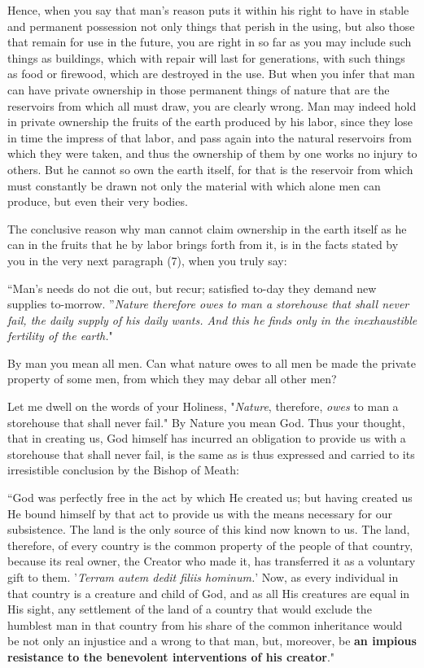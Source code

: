 \documentclass{book}
\begin{document}
Hence, when you say that man’s reason puts it within his right to have in stable and permanent possession not only things that perish in the using, but also those that remain for use in the future, you are right in so far as you may include such things as buildings, which with repair will last for generations, with such things as food or firewood, which are destroyed in the use. But when you infer that man can have private ownership in those permanent things of nature that are the reservoirs from which all must draw, you are clearly wrong. Man may indeed hold in private ownership the fruits of the earth produced by his labor, since they lose in time the impress of that labor, and pass again into the natural reservoirs from which they were taken, and thus the ownership of them by one works no injury to others. But he cannot so own the earth itself, for that is the reservoir from which must constantly be drawn not only the material with which alone men can produce, but even their very bodies.

The conclusive reason why man cannot claim ownership in the earth itself as he can in the fruits that he by labor brings forth from it, is in the facts stated by you in the very next paragraph (7), when you truly say:

“Man’s needs do not die out, but recur; satisfied to-day they demand new supplies to-morrow. ”\emph{Nature therefore owes to man a storehouse that shall never fail, the daily supply of his daily wants. And this he finds only in the inexhaustible fertility of the earth.}"

By man you mean all men. Can what nature owes to all men be made the private property of some men, from which they may debar all other men?

Let me dwell on the words of your Holiness, "\emph{Nature}, therefore, \emph{owes} to man a storehouse that shall never fail." By Nature you mean God. Thus your thought, that in creating us, God himself has incurred an obligation to provide us with a storehouse that shall never fail, is the same as is thus expressed and carried to its irresistible conclusion by the Bishop of Meath:

“God was perfectly free in the act by which He created us; but having created us He bound himself by that act to provide us with the means necessary for our subsistence. The land is the only source of this kind now known to us. The land, therefore, of every country is the common property of the people of that country, because its real owner, the Creator who made it, has transferred it as a voluntary gift to them. '\emph{Terram autem dedit filiis hominum.}' Now, as every individual in that country is a creature and child of God, and as all His creatures are equal in His sight, any settlement of the land of a country that would exclude the humblest man in that country from his share of the common inheritance would be not only an injustice and a wrong to that man, but, moreover, be \textbf{an impious resistance to the benevolent interventions of his creator}."
\end{document}
